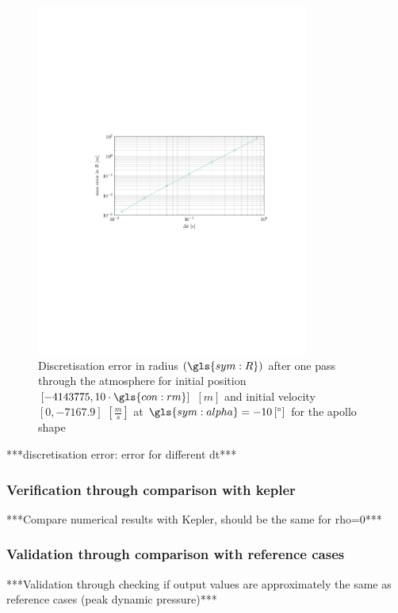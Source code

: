 \begin{figure}[h]
	\centering
	\includegraphics[trim={4.25cm 10cm 3.2cm 10cm},clip,width=0.8\textwidth]{Figure/orbital_model/dicretization.pdf}
	\caption{Discretisation error in radius $\left(\gls{sym:R}\right)$ after one pass through the atmosphere for initial position $\left[-4143775,10\cdot\gls{con:rm}\right]$ $\left[m\right]$ and initial velocity $\left[0,-7167.9\right]$ $\left[\frac{m}{s}\right]$ at $\gls{sym:alpha}=-10\left[^\circ\right]$ for the apollo shape}
	\label{fig:atmos_disc}
\end{figure}

***discretisation error: error for different dt***\\

\subsubsection{Verification through comparison with kepler}
\label{sec:astroverf}
***Compare numerical results with Kepler, should be the same for rho=0***\\

\subsubsection{Validation through comparison with reference cases}
\label{sec:astroval}
***Validation through checking if output values are approximately the same as reference cases (peak dynamic pressure)***\\


